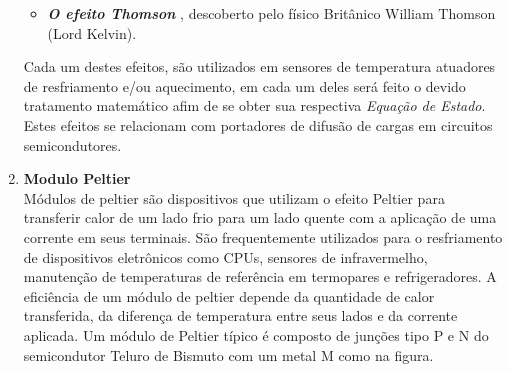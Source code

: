\begin{enumerate}
\begin{itemize}
\item \textbf{\emph{O efeito Thomson}} \cite{huang2000system}, descoberto pelo físico Britânico William Thomson (Lord Kelvin). \\


\end{itemize}
Cada um destes efeitos, são utilizados em sensores de temperatura atuadores de resfriamento e/ou aquecimento, em cada um deles será feito o devido tratamento matemático afim de se obter sua respectiva \emph{Equação de Estado}.\\
Estes efeitos se relacionam com portadores de difusão de cargas em circuitos semicondutores. 

\item \textbf{Modulo Peltier} \\
Módulos de peltier são dispositivos que utilizam o efeito Peltier para transferir calor de um lado frio para um lado quente com a aplicação de uma corrente em seus terminais.
São frequentemente utilizados para o resfriamento de dispositivos eletrônicos como CPUs, sensores de infravermelho, manutenção de temperaturas de referência em termopares e refrigeradores.
A eficiência de um módulo de peltier depende da quantidade de calor transferida, da diferença de temperatura entre seus lados e da corrente aplicada. Um módulo de Peltier típico é composto de junções tipo P e N do semicondutor Teluro de Bismuto com um metal M como na figura.\\
	

\end{enumerate}
